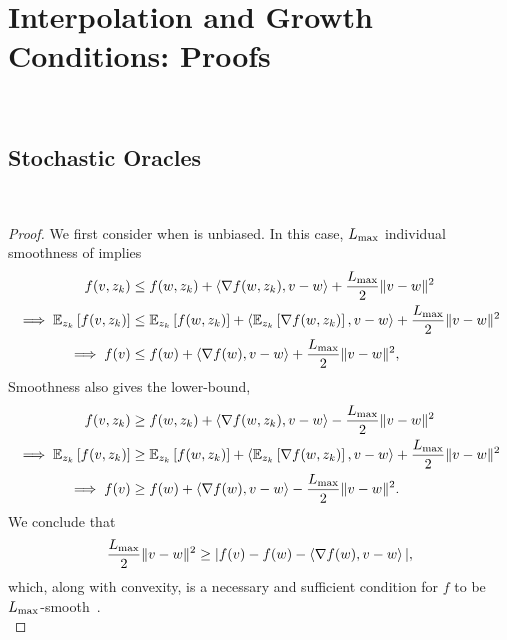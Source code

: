 
\chapter{Interpolation and Growth Conditions: Proofs}~\label{app:interpolation-gc}

\section{Stochastic Oracles}~\label{app:stochastic-oracles}

\indSmoothToSmooth*
\begin{proof}
    We first consider when \oracle{} is unbiased. In this case, \( L_{\text{max}} \) individual smoothness of \oracle{} implies
    \begin{align*}
        f(v, z_{k}) &\leq f(w, z_{k}) + \left\langle\nabla f(w, z_{k}), v - w\right\rangle + \frac{L_{\text{max}}}{2} \|v - w\|^2\\
        \implies \mathbb{E}_{z_{k}} \left[f(v, z_{k})\right] &\leq \mathbb{E}_{z_{k}} \left[f(w, z_{k})\right] + \left\langle\mathbb{E}_{z_{k}} \left[\nabla f(w, z_{k})\right], v - w\right\rangle + \frac{L_{\text{max}}}{2} \|v - w\|^2\\
        \implies f(v) &\leq f(w) + \left\langle\nabla f(w), v - w\right\rangle + \frac{L_{\text{max}}}{2}\|v - w\|^2, 
    \end{align*}
    Smoothness also gives the lower-bound, 
    \begin{align*}
        f(v, z_{k}) &\geq f(w, z_{k}) + \left\langle\nabla f(w, z_{k}), v - w\right\rangle - \frac{L_{\text{max}}}{2} \|v - w\|^2\\
        \implies \mathbb{E}_{z_{k}} \left[f(v, z_{k})\right] &\geq \mathbb{E}_{z_{k}} \left[f(w, z_{k})\right] + \left\langle\mathbb{E}_{z_{k}} \left[\nabla f(w, z_{k})\right], v - w\right\rangle + \frac{L_{\text{max}}}{2} \|v - w\|^2\\
        \implies f(v) &\geq f(w) + \left\langle\nabla f(w), v - w\right\rangle - \frac{L_{\text{max}}}{2}\|v - w\|^2. 
    \end{align*}
    We conclude that 
    \[ \frac{L_{\text{max}}}{2}\|v - w\|^2 \geq |f(v) - f(w) - \left\langle\nabla f(w), v - w\right\rangle|, \] 
    which, along with convexity, is a necessary and sufficient condition for \( f \) to be \( L_{\text{max}} \)-smooth~\citep[Theorem 2.1.5]{nesterov2004lectures}.\\


\end{proof}
